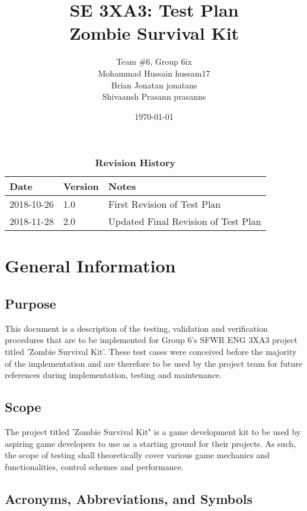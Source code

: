 \documentclass[12pt, titlepage]{article}
\title{SE 3XA3: Test Plan\\Zombie Survival Kit}
\author{Team \#6, Group 6ix
		\\ Mohammad Hussain hussam17
		\\ Brian Jonatan jonatans
		\\ Shivaansh Prasann prasanns
}
\date{\today}
\begin{document}
\maketitle

\tableofcontents
\listoftables
\listoffigures

\begin{table}[bp]
\caption{\bf Revision History}
\begin{tabularx}{\textwidth}{p{3cm}p{2cm}X}
\toprule {\bf Date} & {\bf Version} & {\bf Notes}\\
\midrule
2018-10-26 & 1.0 & First Revision of Test Plan\\
2018-11-28 & 2.0 & Updated Final Revision of Test Plan\\
\bottomrule
\end{tabularx}
\end{table}

\newpage




\section{General Information}

\subsection{Purpose}
This document is a description of the testing, validation and verification procedures that are to be implemented for Group 6's SFWR ENG 3XA3 project titled 'Zombie Survival Kit'. These test cases were conceived before the majority of the implementation and are therefore to be used by the project team for future references during implementation, testing and maintenance.
\subsection{Scope}
The project titled 'Zombie Survival Kit" is a game development kit to be used by aspiring game developers to use as a starting ground for their projects. As such, the scope of testing shall theoretically cover various game mechanics and functionalities, control schemes and performance.
\subsection{Acronyms, Abbreviations, and Symbols}
\end{document}
